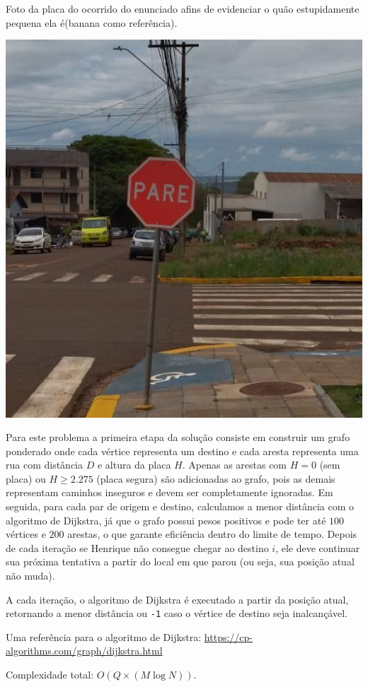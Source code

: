 Foto da placa do ocorrido do enunciado afins de evidenciar o quão estupidamente pequena ela é(banana como referência).

\includegraphics[scale=0.30]{placa.png}

Para este problema a primeira etapa da solução consiste em construir um grafo ponderado onde cada vértice representa um destino e cada aresta representa uma rua com distância $D$ e altura da placa $H$. Apenas as arestas com $H = 0$ (sem placa) ou $H \ge 2.275$ (placa segura) são adicionadas ao grafo, pois as demais representam caminhos inseguros e devem ser completamente ignoradas.
Em seguida, para cada par de origem e destino, calculamos a menor distância com o algoritmo de Dijkstra, já que o grafo possui pesos positivos e pode ter até $100$ vértices e $200$ arestas, o que garante eficiência dentro do limite de tempo.
Depois de cada iteração se Henrique não consegue chegar ao destino $i$, ele deve continuar sua próxima tentativa a partir do local em que parou (ou seja, sua posição atual não muda).

A cada iteração, o algoritmo de Dijkstra é executado a partir da posição atual, retornando a menor distância ou \texttt{-1} caso o vértice de destino seja inalcançável.

Uma referência para o algoritmo de Dijkstra: \url{https://cp-algorithms.com/graph/dijkstra.html}

Complexidade total: \(O(Q \times (M \log N))\).
